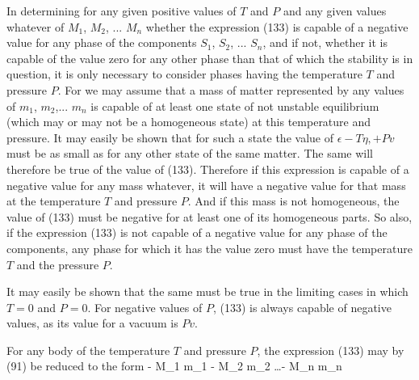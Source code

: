 \documentclass[12pt]{memoir}
\begin{document}
In determining for any given positive values of $T$ and $P$ and any given values whatever of $M_1$, $M_2$, ... $M_n$ whether the expression (133) is capable of a negative value for any phase of the components $S_1$, $S_2$, ... $S_n$, and if not, whether it is capable of the value zero for any other phase than that of which the stability is in question, it is only necessary to consider phases having the temperature $T$ and pressure $P$. For we may assume that a mass of matter represented by any values of $m_1$, $m_2$,... $m_n$ is capable of at least one state of not unstable equilibrium (which may or may not be a homogeneous state) at this temperature and pressure. It may easily be shown that for such a state the value of $\epsilon-T\eta, + Pv$ must be as small as for any other state of the same matter. The same will therefore be true of the value of (133). Therefore if this expression is capable of a negative value for any mass whatever, it will have a negative value for that mass at the temperature $T$ and pressure $P$. And if this mass is not homogeneous, the value of (133) must be negative for at least one of its homogeneous parts. So also, if the expression (133) is not capable of a negative value for any phase of the components, any phase for which it has the value zero must have the temperature $T$ and the pressure $P$.


It may easily be shown that the same must be true in the limiting cases in which $T =0$ and $P =0$. For negative values of $P$, (133) is always capable of negative values, as its value for a vacuum is $Pv$.


For any body of the temperature $T$ and pressure $P$, the expression
(133) may by (91) be reduced to the form
\eqs \xi - M_1 m_1 - M_2 m_2 \dots - M_n m_n \label{135}\eqe
\end{document}
